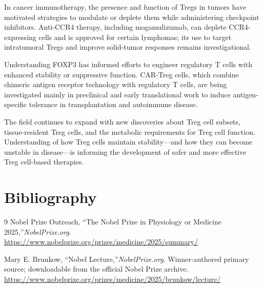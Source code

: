 In cancer immunotherapy, the presence and function of Tregs in tumors have motivated strategies to modulate or deplete them while administering checkpoint inhibitors. Anti-CCR4 therapy, including mogamulizumab, can deplete CCR4-expressing cells and is approved for certain lymphomas; its use to target intratumoral Tregs and improve solid-tumor responses remains investigational.

Understanding FOXP3 has informed efforts to engineer regulatory T cells with enhanced stability or suppressive function. CAR-Treg cells, which combine chimeric antigen receptor technology with regulatory T cells, are being investigated mainly in preclinical and early translational work to induce antigen-specific tolerance in transplantation and autoimmune disease.

The field continues to expand with new discoveries about Treg cell subsets, tissue-resident Treg cells, and the metabolic requirements for Treg cell function. Understanding of how Treg cells maintain stability---and how they can become unstable in disease---is informing the development of safer and more effective Treg cell-based therapies.


\section{Bibliography}

\begin{thebibliography}{9}
Nobel Prize Outreach, ``The Nobel Prize in Physiology or Medicine 2025,''\emph{NobelPrize.org}.\\
\url{https://www.nobelprize.org/prizes/medicine/2025/summary/}

Mary E. Brunkow, ``Nobel Lecture,''\emph{NobelPrize.org}. Winner-authored primary source; downloadable from the official Nobel Prize archive.\\
\url{https://www.nobelprize.org/prizes/medicine/2025/brunkow/lecture/}
\end{thebibliography}
